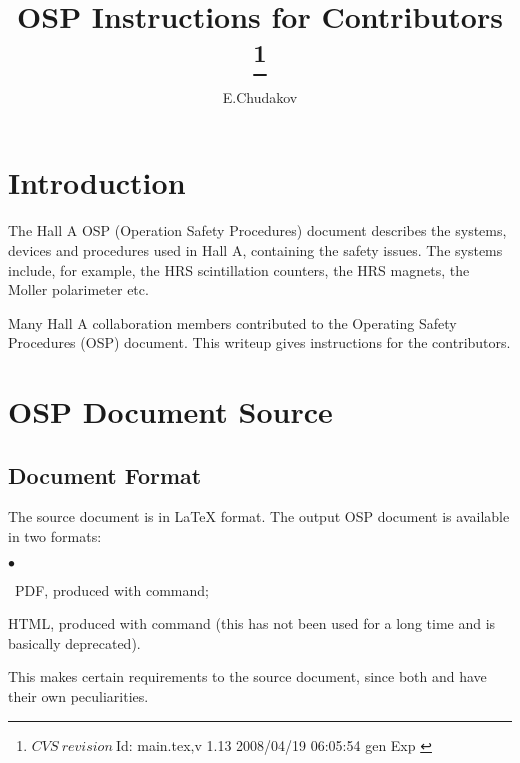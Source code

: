 \documentclass[12pt,letterpaper]{article}
\begin{document}
\color{\Mcol}
\pagestyle{headings}

\begin{titlepage}
\title{{\bf OSP Instructions for Contributors
\thanks{
 $CVS~revision~ $Id: main.tex,v 1.13 2008/04/19 06:05:54 gen Exp $ $
}
}}

\author{E.Chudakov} 
\setcounter{tocdepth}{3}
\end{titlepage} 
\maketitle 
 
\tableofcontents



\section{Introduction}
\label{sec:intro}

  The Hall A\cite{Hallawww} OSP (Operation Safety Procedures) document describes  
  the systems, devices and procedures used in Hall A, containing
  the safety issues. The systems include, for example, the HRS
  scintillation counters, the HRS magnets, the Moller polarimeter
  etc. 

  Many Hall A collaboration members contributed to the Operating Safety 
  Procedures (OSP) document. This writeup gives instructions for the
  contributors\cite{OSPgen}.

\section{OSP Document Source}
\label{sec:document}
   
\subsection{Document Format}
\label{sec:format}   

  The source document is in \LaTeX{} format.
  The output OSP document is available in two formats: 
  \begin{list}{$\bullet$}{\setlength{\itemsep}{-0.15cm}}
    \item ~PDF, produced with  command; 
    \item HTML, produced with  command (this has not been used for a long
          time and is basically deprecated). 
  \end{list}
  This makes certain requirements to the source document,
  since both  and  have their own
  peculiarities.
\end{document}
